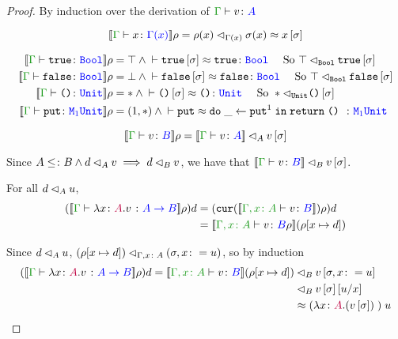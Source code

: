 \documentclass{Report}
\begin{document}
\begin{proof}
    By induction over the derivation of $\gtyperelation{v}{A}$

    \begin{equation}
        \deno{\gtyperelation{x}{\G(x)}}\rho = \logRel{\rho(x)}{\G(x)}{\si(x)}\beequiv x\ssi
    \end{equation}

    \begin{align}
        \deno{\gtyperelation{\t}{\B}} \rho & = \top \wedge \zberelation{\t\ssi}{\t}{\B} \qt{ So } \logRel{\top}{\B}{\t\ssi}\\
        \deno{\gtyperelation{\f}{\B}} \rho & = \bot \wedge \zberelation{\f\ssi}{\f}{\B} \qt{ So } \logRel{\top}{\B}{\f\ssi}\\
        \deno{\gtyperelation{\u}{\U}} \rho & = \singleton \wedge \zberelation{\u\ssi}{\u}{\U} \qt{ So } \logRel{\singleton}{\U}{\u\ssi}\\
        \deno{\gtyperelation{\put}{\M{1}{\U}}} \rho & = (1, \singleton)\wedge \zberelation{\put}{\doin{\_}{\put^1}{\return{\u}}}{\M{1}{\U}}\\ 
    \end{align}


    \case{\vsubtype}

    \begin{equation}
        \deno{\gtyperelation{v}{B}}\rho = \logRel{\deno{\gtyperelation{v}{A}}}{A}{v\ssi}
    \end{equation}

    Since $A\leq\colon B \wedge d \lhd_{A} v \implies d \lhd_{B} v$, we have that $\logRel{\deno{\gtyperelation{v}{B}}}{B}{v\ssi}$.

    \case{\vfun}

    For all $d \lhd_{A} u$, 
    \begin{align}
        (\deno{\gtyperelation{\lam{x}{A}{v}}{\ab}}\rho)d & = (\cur{\deno{\typerelation{\gax}{v}{B}}}\rho)d\\
        & = \deno{\typerelation{\gax}{v}{B}\rho}(\rho[x\mapsto d])\\
    \end{align}

    Since $d \lhd_{A} u$, $(\rho[x\mapsto d]) \lhd_{\Gamma, x\colon A} (\sigma, x\colon= u)$, so by induction
    \begin{align}
        (\deno{\gtyperelation{\lam{x}{A}{v}}{\ab}}\rho)d = \logRel{\deno{\typerelation{\gax}{v}{B}}(\rho[x\mapsto d])&}{B}{v\sub{\si, x\setto u}}
        \\
        \logRel{&}{B}{v\ssi\ssub{x}{u}}\\
        & \beequiv \apply{(\lam{x}{A}{(v\ssi)})}{u}
    \end{align}
\end{proof}
\end{document}
